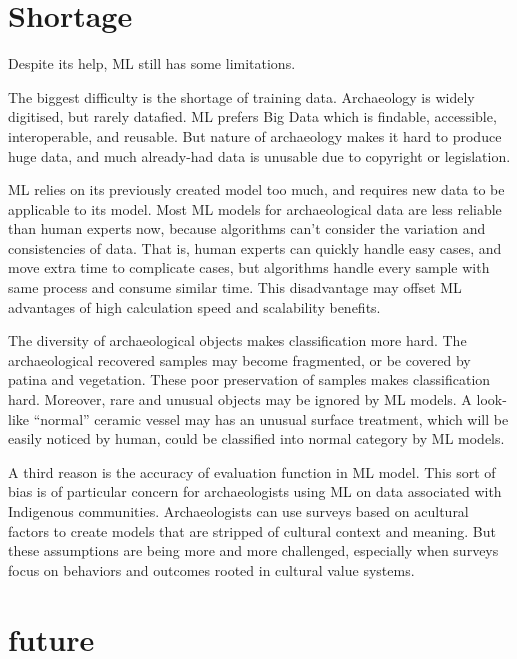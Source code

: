 \documentclass[journal]{IEEEtran}
\begin{document}
	
	\section{Shortage}
	
	Despite its help, ML still has some limitations.
	
	The biggest difficulty is the shortage of training data. Archaeology is widely digitised, but rarely datafied\cite{Anichini2018BigAD}. ML prefers Big Data which is findable, accessible, interoperable, and reusable. But nature of archaeology makes it hard to produce huge data, and much already-had data is unusable due to copyright or legislation.\cite{heritage4010008}
	
	ML relies on its previously created model too much, and requires new data to be applicable to its model. Most ML models for archaeological data are less reliable than human experts now, because algorithms can't consider the variation and consistencies of data. That is, human experts can quickly handle easy cases, and move extra time to complicate cases, but algorithms handle every sample with same process and consume similar time. This disadvantage may offset ML advantages of high calculation speed and scalability benefits.\cite{bickler_2021}
	
	The diversity of archaeological  objects makes classification more hard. The archaeological recovered samples may become fragmented, or be covered by patina and vegetation. These poor preservation of samples makes classification hard. Moreover, rare and unusual objects may be ignored by ML models. A look-like ``normal'' ceramic vessel may has an unusual surface treatment, which will be easily noticed by human, could be classified into normal category by ML models.\cite{bickler_2021}
	
	A third reason is the accuracy of evaluation function in ML model. This sort of bias is of particular concern for archaeologists using ML on data associated with Indigenous communities. Archaeologists can use surveys based on acultural factors to create models that are stripped of cultural context and meaning. But these assumptions are being more and more challenged, especially when surveys focus on behaviors and outcomes rooted in cultural value systems.\cite{2020_challenge}\cite{2019_challenge}
	


	\section{future}
\end{document}
